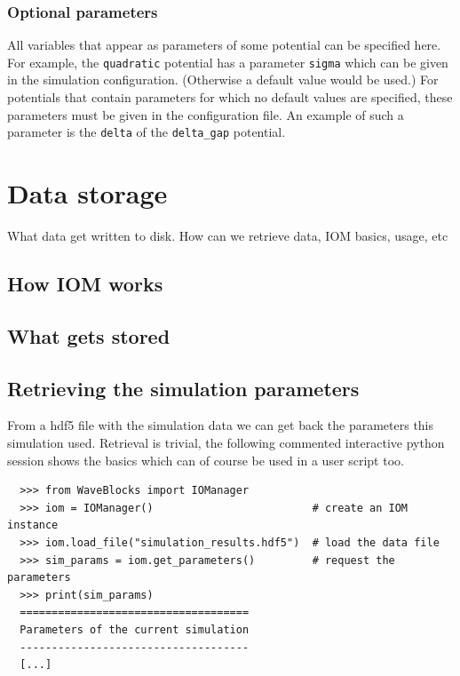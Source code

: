 \documentclass[a4paper,10pt]{report}
\begin{document}
\subsubsection{Optional parameters}

All variables that appear as parameters of some potential can be specified
here. For example, the \texttt{quadratic} potential has a parameter \texttt{sigma}
which can be given in the simulation configuration. (Otherwise a default value
would be used.) For potentials that contain parameters for which no default
values are specified, these parameters must be given in the configuration file.
An example of such a parameter is the \texttt{delta} of the \texttt{delta\_gap} potential.


\section{Data storage}

What data get written to disk. How can we retrieve data, IOM basics, usage, etc

\subsection{How IOM works}

\subsection{What gets stored}

\subsection{Retrieving the simulation parameters}

From a hdf5 file with the simulation data we can get back the parameters this
simulation used. Retrieval is trivial, the following commented interactive python
session shows the basics which can of course be used in a user script too.

\begin{verbatim}
  >>> from WaveBlocks import IOManager
  >>> iom = IOManager()                         # create an IOM instance
  >>> iom.load_file("simulation_results.hdf5")  # load the data file
  >>> sim_params = iom.get_parameters()         # request the parameters
  >>> print(sim_params)
  ====================================
  Parameters of the current simulation
  ------------------------------------
  [...]
\end{verbatim}
\end{document}
